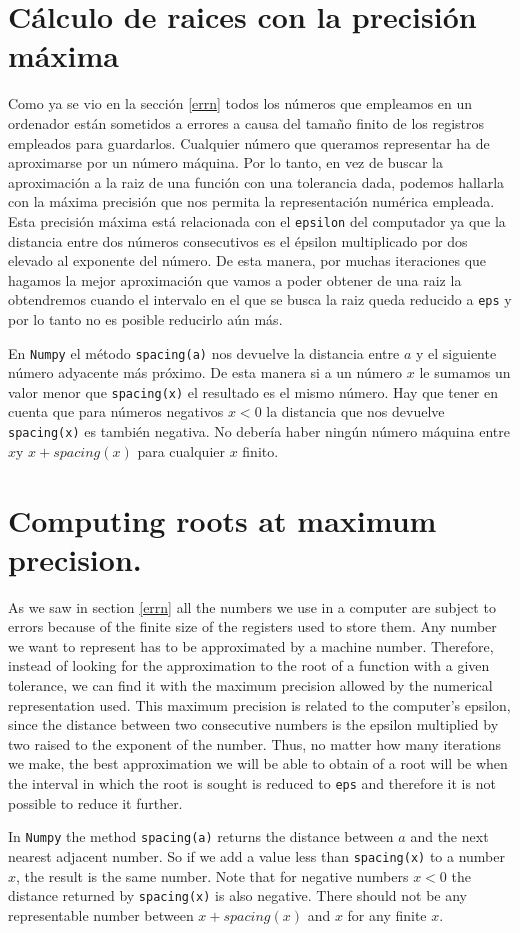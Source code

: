 \begin{paracol}{2}
\section{Cálculo de raices con la precisión máxima}
Como ya se vio en la sección \ref{errn} todos los números que empleamos en un ordenador están sometidos a errores a causa del tamaño finito de los registros empleados para guardarlos. Cualquier número que queramos representar ha de aproximarse por un número máquina. Por lo tanto, en vez de buscar la aproximación a la raiz de una función con una tolerancia dada, podemos hallarla con la máxima precisión que nos permita la representación numérica empleada. Esta precisión máxima está relacionada con el \texttt{epsilon} del computador ya que la distancia entre dos números consecutivos es el épsilon multiplicado por dos elevado al exponente del número. De esta manera, por muchas iteraciones que hagamos la mejor aproximación que vamos a poder obtener de una raiz la obtendremos cuando el intervalo en el que se busca la raiz queda reducido a \texttt{eps} y por lo tanto no es posible reducirlo aún más. 

En \texttt{Numpy} el método \texttt{spacing(a)} nos devuelve la distancia entre $a$ y el siguiente número adyacente más próximo. De esta manera si a un número $x$ le sumamos un valor menor que \texttt{spacing(x)} el resultado es el mismo número. Hay que tener en cuenta que para números negativos $x<0$ la distancia que nos devuelve \texttt{spacing(x)} es también negativa. No debería haber ningún número máquina entre $x$y $x+spacing(x)$ para cualquier $x$ finito.

\switchcolumn
\section{Computing roots at maximum precision.}
As we saw in section \ref{errn} all the numbers we use in a computer are subject to errors because of the finite size of the registers used to store them. Any number we want to represent has to be approximated by a machine number. Therefore, instead of looking for the approximation to the root of a function with a given tolerance, we can find it with the maximum precision allowed by the numerical representation used. This maximum precision is related to the computer's epsilon, since the distance between two consecutive numbers is the epsilon multiplied by two raised to the exponent of the number. Thus, no matter how many iterations we make, the best approximation we will be able to obtain of a root will be when the interval in which the root is sought is reduced to \texttt{eps} and therefore it is not possible to reduce it further. 

In \texttt{Numpy} the method \texttt{spacing(a)} returns the distance between $a$ and the next nearest adjacent number. So if we add a value less than \texttt{spacing(x)} to a number $x$, the result is the same number. Note that for negative numbers $x<0$ the distance returned by \texttt{spacing(x)} is also negative. There should not be any representable number between $x + spacing(x)$ and $x$ for any finite $x$.

\end{paracol}  


